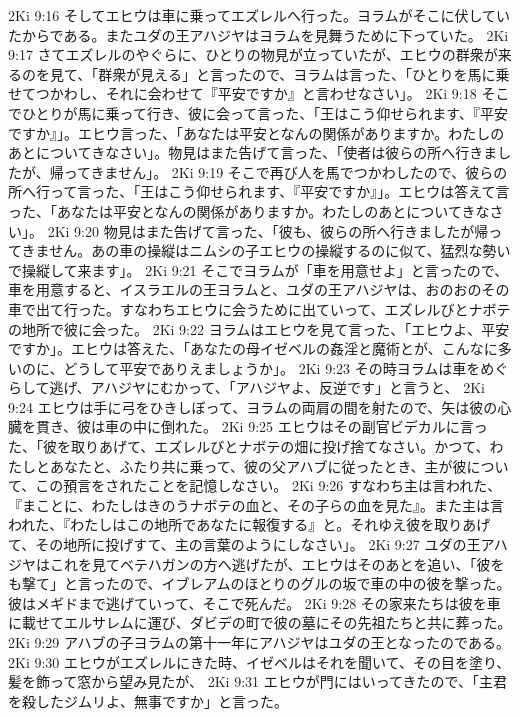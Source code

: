 2Ki 9:16  そしてエヒウは車に乗ってエズレルへ行った。ヨラムがそこに伏していたからである。またユダの王アハジヤはヨラムを見舞うために下っていた。
2Ki 9:17  さてエズレルのやぐらに、ひとりの物見が立っていたが、エヒウの群衆が来るのを見て、「群衆が見える」と言ったので、ヨラムは言った、「ひとりを馬に乗せてつかわし、それに会わせて『平安ですか』と言わせなさい」。
2Ki 9:18  そこでひとりが馬に乗って行き、彼に会って言った、「王はこう仰せられます、『平安ですか』」。エヒウ言った、「あなたは平安となんの関係がありますか。わたしのあとについてきなさい」。物見はまた告げて言った、「使者は彼らの所へ行きましたが、帰ってきません」。
2Ki 9:19  そこで再び人を馬でつかわしたので、彼らの所へ行って言った、「王はこう仰せられます、『平安ですか』」。エヒウは答えて言った、「あなたは平安となんの関係がありますか。わたしのあとについてきなさい」。
2Ki 9:20  物見はまた告げて言った、「彼も、彼らの所へ行きましたが帰ってきません。あの車の操縦はニムシの子エヒウの操縦するのに似て、猛烈な勢いで操縦して来ます」。
2Ki 9:21  そこでヨラムが「車を用意せよ」と言ったので、車を用意すると、イスラエルの王ヨラムと、ユダの王アハジヤは、おのおのその車で出て行った。すなわちエヒウに会うために出ていって、エズレルびとナボテの地所で彼に会った。
2Ki 9:22  ヨラムはエヒウを見て言った、「エヒウよ、平安ですか」。エヒウは答えた、「あなたの母イゼベルの姦淫と魔術とが、こんなに多いのに、どうして平安でありえましょうか」。
2Ki 9:23  その時ヨラムは車をめぐらして逃げ、アハジヤにむかって、「アハジヤよ、反逆です」と言うと、
2Ki 9:24  エヒウは手に弓をひきしぼって、ヨラムの両肩の間を射たので、矢は彼の心臓を貫き、彼は車の中に倒れた。
2Ki 9:25  エヒウはその副官ビデカルに言った、「彼を取りあげて、エズレルびとナボテの畑に投げ捨てなさい。かつて、わたしとあなたと、ふたり共に乗って、彼の父アハブに従ったとき、主が彼について、この預言をされたことを記憶しなさい。
2Ki 9:26  すなわち主は言われた、『まことに、わたしはきのうナボテの血と、その子らの血を見た』。また主は言われた、『わたしはこの地所であなたに報復する』と。それゆえ彼を取りあげて、その地所に投げすて、主の言葉のようにしなさい」。
2Ki 9:27  ユダの王アハジヤはこれを見てベテハガンの方へ逃げたが、エヒウはそのあとを追い、「彼をも撃て」と言ったので、イブレアムのほとりのグルの坂で車の中の彼を撃った。彼はメギドまで逃げていって、そこで死んだ。
2Ki 9:28  その家来たちは彼を車に載せてエルサレムに運び、ダビデの町で彼の墓にその先祖たちと共に葬った。
2Ki 9:29  アハブの子ヨラムの第十一年にアハジヤはユダの王となったのである。
2Ki 9:30  エヒウがエズレルにきた時、イゼベルはそれを聞いて、その目を塗り、髪を飾って窓から望み見たが、
2Ki 9:31  エヒウが門にはいってきたので、「主君を殺したジムリよ、無事ですか」と言った。
